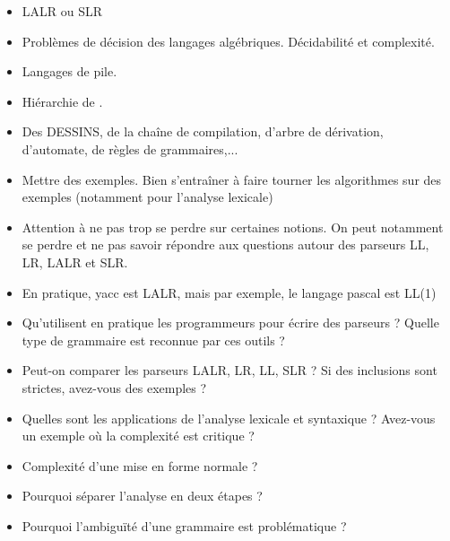 \documentclass{agregfiche}
\begin{document}
\secidees

\begin{itemize}
    \item LALR ou SLR
    \item Problèmes de décision des langages algébriques. Décidabilité et complexité.
    \item Langages de pile.
    \item Hiérarchie de .
\end{itemize}

\secpieges

\begin{itemize}
    \item Des DESSINS, de la chaîne de compilation, d'arbre de dérivation, d'automate, de règles de grammaires,...
    \item Mettre des exemples. Bien s'entraîner à faire tourner les algorithmes sur des exemples (notamment pour l'analyse lexicale)
	\item Attention à ne pas trop se perdre sur certaines notions. On peut notamment se perdre et ne pas savoir répondre aux questions autour des parseurs LL, LR, LALR et SLR.
    \item En pratique, yacc est LALR, mais par exemple, le langage pascal est LL(1)

\end{itemize}

\secquestionsclassiques

\begin{itemize}
	\item Qu'utilisent en pratique les programmeurs pour écrire des parseurs ? Quelle type de grammaire est reconnue par ces outils ?
\item Peut-on comparer les parseurs LALR, LR, LL, SLR ? Si  des inclusions sont strictes, avez-vous des exemples ?
\item Quelles sont les applications de l'analyse lexicale et
syntaxique ? Avez-vous un exemple où la complexité est critique ?
\item Complexité d'une mise en forme normale ?
\item Pourquoi séparer l'analyse en deux étapes ?
\item Pourquoi l'ambiguïté d'une grammaire est problématique ?

\end{itemize}
\end{document}
